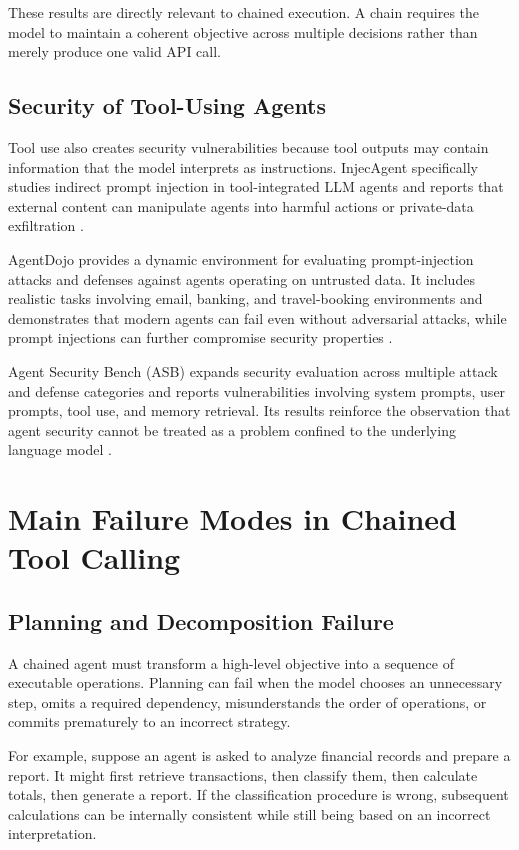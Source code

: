 \documentclass[11pt]{article}
\begin{document}
These results are directly relevant to chained execution. A chain requires the model to
maintain a coherent objective across multiple decisions rather than merely produce
one valid API call.

\subsection{Security of Tool-Using Agents}

Tool use also creates security vulnerabilities because tool outputs may contain
information that the model interprets as instructions. InjecAgent specifically studies
indirect prompt injection in tool-integrated LLM agents and reports that external
content can manipulate agents into harmful actions or private-data exfiltration \cite{zhan2024injecagent}.

AgentDojo provides a dynamic environment for evaluating prompt-injection attacks
and defenses against agents operating on untrusted data. It includes realistic tasks
involving email, banking, and travel-booking environments and demonstrates that
modern agents can fail even without adversarial attacks, while prompt injections can
further compromise security properties \cite{debenedetti2024agentdojo}.

Agent Security Bench (ASB) expands security evaluation across multiple attack and
defense categories and reports vulnerabilities involving system prompts, user
prompts, tool use, and memory retrieval. Its results reinforce the observation that
agent security cannot be treated as a problem confined to the underlying language
model \cite{zhang2025asb}.

\section{Main Failure Modes in Chained Tool Calling}
\label{sec:failure-modes}

\subsection{Planning and Decomposition Failure}

A chained agent must transform a high-level objective into a sequence of executable
operations. Planning can fail when the model chooses an unnecessary step, omits a
required dependency, misunderstands the order of operations, or commits
prematurely to an incorrect strategy.

For example, suppose an agent is asked to analyze financial records and prepare a
report. It might first retrieve transactions, then classify them, then calculate totals,
then generate a report. If the classification procedure is wrong, subsequent
calculations can be internally consistent while still being based on an incorrect
interpretation.
\end{document}
